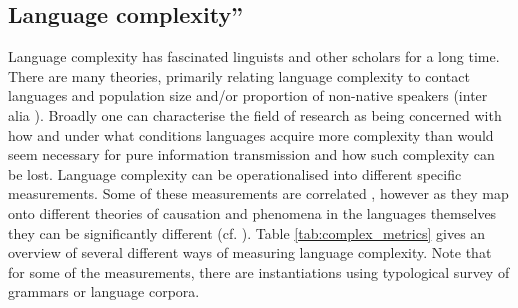 \documentclass[a4paper]{article}
\begin{document}
\subsection{Language complexity''}
Language complexity has fascinated linguists and other scholars for a long time. There are many theories, primarily relating language complexity to contact languages \citep{mcwhorter_200} and population size and/or proportion of non-native speakers (inter alia \citet{wray2007consequences, dahl2004growth, lupyan2010language, bentz2013languages, bentz2015adaptive, raviv2019larger, koplenig2019language, shcherbakova2023societies}). Broadly one can characterise the field of research as being concerned with how and under what conditions languages acquire more complexity than would seem necessary for pure information transmission and how such complexity can be lost.
Language complexity can be operationalised into different specific measurements. 
Some of these measurements are correlated \citep{bentz2016comparison}, however as they map onto different theories of causation and phenomena in the languages themselves they can be significantly different (cf. \citet{lupyan2024cautionary}). 
Table \ref{tab:complex_metrics} gives an overview of several different ways of measuring language complexity. Note that for some of the measurements, there are instantiations using typological survey of grammars or language corpora.
\end{document}
